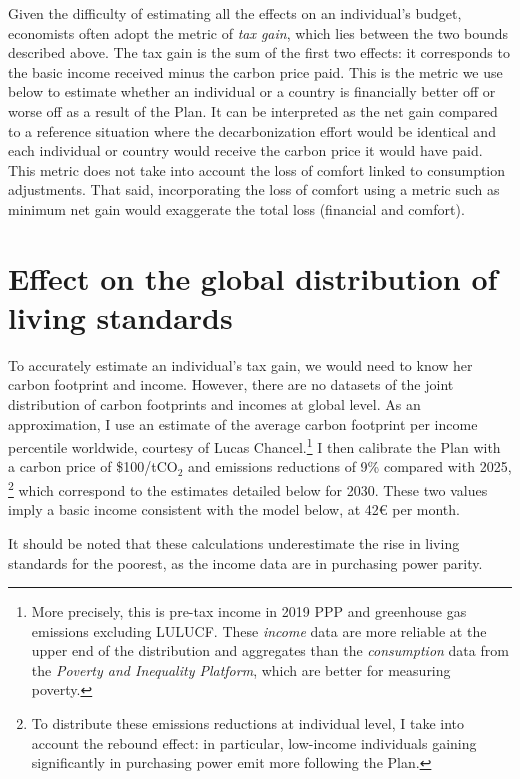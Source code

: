 \documentclass[a5paper,english,openany]{memoir}
\begin{document}
Given the difficulty of estimating all the effects on an individual's budget, economists often adopt the metric of \textit{tax gain}, which lies between the two bounds described above. The tax gain is the sum of the first two effects: it corresponds to the basic income received minus the carbon price paid. This is the metric we use below to estimate whether an individual or a country is financially better off or worse off as a result of the Plan. It can be interpreted as the net gain compared to a reference situation where the decarbonization effort would be identical and each individual or country would receive the carbon price it would have paid. This metric does not take into account the loss of comfort linked to consumption adjustments. That said, incorporating the loss of comfort using a metric such as minimum net gain would exaggerate the total loss (financial and comfort).

\section{Effect on the global distribution of living standards}\label{app:revenus}

To accurately estimate an individual's tax gain, we would need to know her carbon footprint and income. However, there are no datasets of the joint distribution of carbon footprints and incomes at global level. As an approximation, I use an estimate of the average carbon footprint per income percentile worldwide, courtesy of Lucas Chancel.\footnote{More precisely, this is pre-tax income in 2019 PPP \textit{\texteuro{}} and greenhouse gas emissions excluding LULUCF. These \textit{income} data are more reliable at the upper end of the distribution and aggregates than the \textit{consumption} data from the \textit{Poverty and Inequality Platform}, which are better for measuring poverty.} I then calibrate the Plan with a carbon price of \$100/tCO$_\text{2}$ and emissions reductions of 9\% compared with 2025,%
\footnote{To distribute these emissions reductions at individual level, I take into account the rebound effect: in particular, low-income individuals gaining significantly in purchasing power emit more following the Plan.} which correspond to the estimates detailed below for 2030. These two values imply a basic income consistent with the model below, at 42\euro{} per month. %

It should be noted that these calculations underestimate the rise in living standards for the poorest, as the income data are in purchasing power parity.
\end{document}
